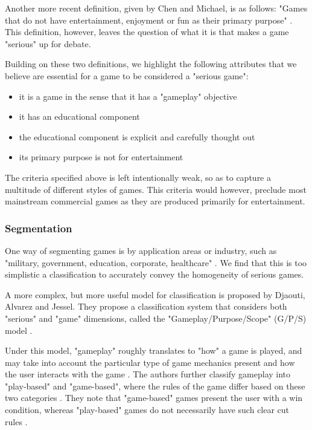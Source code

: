 \documentclass[11pt]{article}
\begin{document}
    Another more recent definition, given by Chen and Michael, is as follows: "Games that do not have entertainment, enjoyment or fun as their primary purpose" \citet{alternativeDefinition}. This definition, however, leaves the question of what it is that makes a game "serious" up for debate.

    Building on these two definitions, we highlight the following attributes that we believe are essential for a game to be considered a "serious game":
        \begin{itemize}
            \item it is a game in the sense that it has a "gameplay" objective
            \item it has an educational component
            \item the educational component is explicit and carefully thought out
            \item its primary purpose is not for entertainment
        \end{itemize}

    The criteria specified above is left intentionally weak, so as to capture a multitude of different styles of games. This criteria would however, preclude most mainstream commercial games as they are produced primarily for entertainment.

    

    \subsubsection{Segmentation}
    One way of segmenting games is by application areas or industry, such as "military, government, education, corporate, healthcare" \citet{seriousgamesoverview}. We find that this is too simplistic a classification to accurately convey the homogeneity of serious games. 

    A more complex, but more useful model for classification is proposed by Djaouti, Alvarez and Jessel. They propose a classification system that considers both "serious" and "game" dimensions, called the "Gameplay/Purpose/Scope" (G/P/S) model \citet{classification}.

    Under this model, "gameplay" roughly translates to "how" a game is played, and may take into account the particular type of game mechanics present and how the user interacts with the game \citet{classification}. The authors further classify gameplay into "play-based" and "game-based", where the rules of the game differ based on these two categories \cite{classification}. They note that "game-based" games present the user with a win condition, whereas "play-based" games do not necessarily have such clear cut rules \citet{classification}.
    
\end{document}
